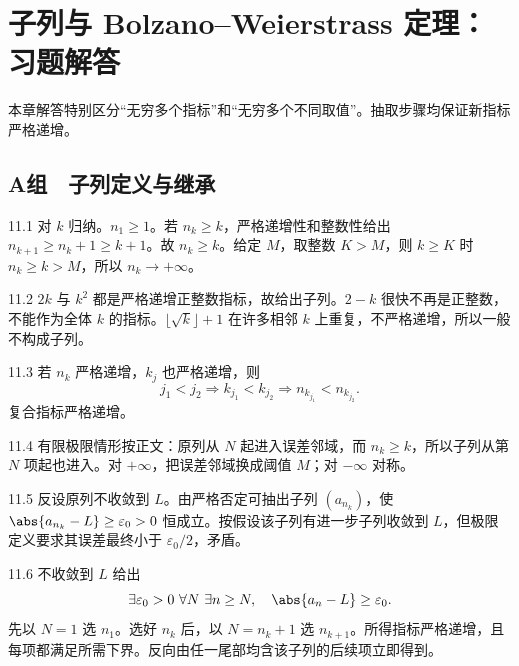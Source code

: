 \chapter{子列与 Bolzano--Weierstrass 定理：习题解答}

\begin{chapterguide}
本章解答特别区分“无穷多个指标”和“无穷多个不同取值”。抽取步骤均保证新指标严格递增。
\end{chapterguide}

\section*{A组　子列定义与继承}

\begin{solution}{11.1}
对 \(k\) 归纳。\(n_1\ge1\)。若 \(n_k\ge k\)，严格递增性和整数性给出
\(n_{k+1}\ge n_k+1\ge k+1\)。故 \(n_k\ge k\)。给定 \(M\)，取整数 \(K>M\)，则 \(k\ge K\) 时 \(n_k\ge k>M\)，所以 \(n_k\to+\infty\)。
\end{solution}

\begin{solution}{11.2}
\(2k\) 与 \(k^2\) 都是严格递增正整数指标，故给出子列。\(2-k\) 很快不再是正整数，不能作为全体 \(k\) 的指标。\(\lfloor\sqrt k\rfloor+1\) 在许多相邻 \(k\) 上重复，不严格递增，所以一般不构成子列。
\end{solution}

\begin{solution}{11.3}
若 \(n_k\) 严格递增，\(k_j\) 也严格递增，则
\[
 j_1<j_2\Longrightarrow k_{j_1}<k_{j_2}
 \Longrightarrow n_{k_{j_1}}<n_{k_{j_2}}.
\]
复合指标严格递增。
\end{solution}

\begin{solution}{11.4}
有限极限情形按正文：原列从 \(N\) 起进入误差邻域，而 \(n_k\ge k\)，所以子列从第 \(N\) 项起也进入。对 \(+\infty\)，把误差邻域换成阈值 \(M\)；对 \(-\infty\) 对称。
\end{solution}

\begin{solution}{11.5}
反设原列不收敛到 \(L\)。由严格否定可抽出子列 \((a_{n_k})\)，使
\(\abs{a_{n_k}-L}\ge\varepsilon_0>0\) 恒成立。按假设该子列有进一步子列收敛到 \(L\)，但极限定义要求其误差最终小于 \(\varepsilon_0/2\)，矛盾。
\end{solution}

\begin{solution}{11.6}
不收敛到 \(L\) 给出
\[
 \exists\varepsilon_0>0\ \forall N\ \exists n\ge N,\quad
 \abs{a_n-L}\ge\varepsilon_0.
\]
先以 \(N=1\) 选 \(n_1\)。选好 \(n_k\) 后，以 \(N=n_k+1\) 选 \(n_{k+1}\)。所得指标严格递增，且每项都满足所需下界。反向由任一尾部均含该子列的后续项立即得到。
\end{solution}

